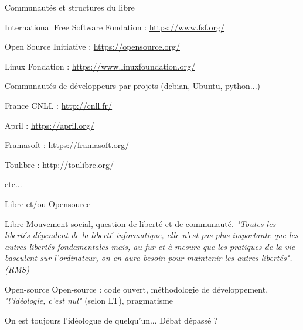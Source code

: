 \documentclass{beamer}
\begin{document}

\begin{frame}{Communautés et structures du libre}

  \begin{block}{International}
    Free Software Fondation : \url{https://www.fsf.org/}

    Open Source Initiative : \url{https://opensource.org/}

    Linux Fondation : \url{https://www.linuxfoundation.org/}

    Communautés de développeurs par projets (debian, Ubuntu, python...)
  \end{block}

\pause

  \begin{block}{France}
    CNLL : \url{http://cnll.fr/}

    April : \url{https://april.org/}

    Framasoft : \url{https://framasoft.org/}

    Toulibre : \url{http://toulibre.org/}

    etc...
  \end{block}
\end{frame}



\begin{frame}{Libre et/ou Opensource}

  \begin{block}{Libre}
    Mouvement social, question de liberté et de communauté. \textit{"Toutes les libertés dépendent de la liberté informatique, elle n’est pas plus importante que les autres libertés fondamentales mais, au fur et à mesure que les pratiques de la vie basculent sur l’ordinateur, on en aura besoin pour maintenir les autres libertés". (RMS)}
  \end{block}

  \begin{block}{Open-source}
    Open-source : code ouvert, méthodologie de développement, \textit{"l'idéologie, c'est nul"} (selon LT), pragmatisme
  \end{block}

On est toujours l'idéologue de quelqu'un... Débat dépassé ?
\end{frame}
\end{document}
